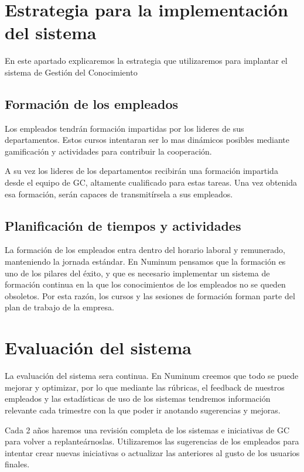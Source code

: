 \documentclass[twoside]{article}
\begin{document}

\section{Estrategia para la implementación del sistema}

En este apartado explicaremos la estrategia que utilizaremos para implantar el sistema de Gestión del Conocimiento

\subsection{Formación de los empleados}

Los empleados tendrán formación impartidas por los lideres de sus departamentos. Estos cursos intentaran ser lo mas dinámicos posibles mediante gamificación y actividades para contribuir la cooperación. \par
A su vez los lideres de los departamentos recibirán una formación impartida desde el equipo de GC, altamente cualificado para estas tareas. Una vez obtenida esa formación, serán capaces de transmitírsela a sus empleados.

\subsection{Planificación de tiempos y actividades}

La formación de los empleados entra dentro del horario laboral y remunerado, manteniendo la jornada estándar. En Numinum pensamos que la formación es uno de los pilares del éxito, y que es necesario implementar un sistema de formación continua en la que los conocimientos de los empleados no se queden obsoletos. Por esta razón, los cursos y las sesiones de formación forman parte del plan de trabajo de la empresa.


\section{Evaluación del sistema}

La evaluación del sistema sera continua. En Numinum creemos que todo se puede mejorar y optimizar, por lo que mediante las rúbricas, el feedback de nuestros empleados y las estadísticas de uso de los sistemas tendremos información relevante cada trimestre con la que poder ir anotando sugerencias y mejoras. \par
Cada 2 años haremos una revisión completa de los sistemas e iniciativas de GC para volver a replanteárnoslas. Utilizaremos las sugerencias de los empleados para intentar crear nuevas iniciativas o actualizar las anteriores al gusto de los usuarios finales.
\end{document}
